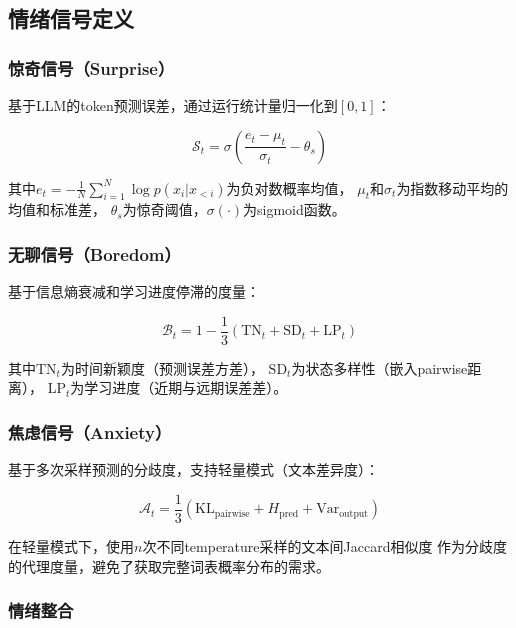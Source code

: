 \documentclass[11pt,a4paper]{article}
\newcommand{\surprise}{\mathcal{S}}
\newcommand{\boredom}{\mathcal{B}}
\newcommand{\anxiety}{\mathcal{A}}
\begin{document}
\subsection{情绪信号定义}

\subsubsection{惊奇信号（Surprise）}

基于LLM的token预测误差，通过运行统计量归一化到$[0,1]$：

\begin{equation}
\surprise_t = \sigma\left(\frac{e_t - \mu_t}{\sigma_t} - \theta_s\right)
\end{equation}

其中$e_t = -\frac{1}{N}\sum_{i=1}^{N}\log p(x_i | x_{<i})$为负对数概率均值，
$\mu_t$和$\sigma_t$为指数移动平均的均值和标准差，
$\theta_s$为惊奇阈值，$\sigma(\cdot)$为sigmoid函数。

\subsubsection{无聊信号（Boredom）}

基于信息熵衰减和学习进度停滞的度量：

\begin{equation}
\boredom_t = 1 - \frac{1}{3}\left(\text{TN}_t + \text{SD}_t + \text{LP}_t\right)
\end{equation}

其中$\text{TN}_t$为时间新颖度（预测误差方差），
$\text{SD}_t$为状态多样性（嵌入pairwise距离），
$\text{LP}_t$为学习进度（近期与远期误差差）。

\subsubsection{焦虑信号（Anxiety）}

基于多次采样预测的分歧度，支持轻量模式（文本差异度）：

\begin{equation}
\anxiety_t = \frac{1}{3}\left(\text{KL}_{\text{pairwise}} + H_{\text{pred}} + \text{Var}_{\text{output}}\right)
\end{equation}

在轻量模式下，使用$n$次不同temperature采样的文本间Jaccard相似度
作为分歧度的代理度量，避免了获取完整词表概率分布的需求。

\subsubsection{情绪整合}
\end{document}
